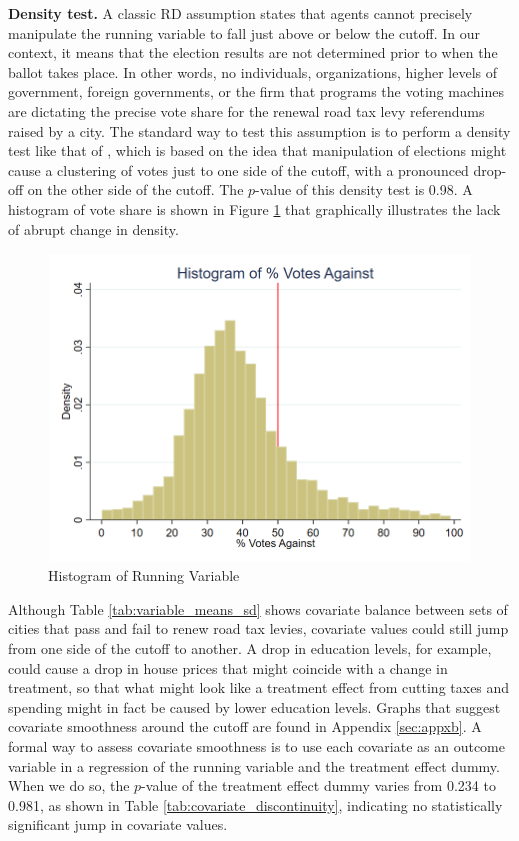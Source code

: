 {\bf Density test.} A classic RD assumption states that agents cannot precisely manipulate the running variable to fall just above or below the cutoff. In our context, it means that the election results are not determined prior to when the ballot takes place. In other words, no individuals, organizations, higher levels of government, foreign governments, or the firm that programs the voting machines are dictating the precise vote share for the renewal road tax levy referendums raised by a city. The standard way to test this assumption is to perform a density test like that of \cite{cattaneo2020simple}, which is based on the idea that manipulation of elections might cause a clustering of votes just to one side of the cutoff, with a pronounced drop-off on the other side of the cutoff. The $p$-value of this density test is 0.98. A histogram of vote share is shown in Figure \ref{fig:running_var_hist} that graphically illustrates the lack of abrupt change in density.

\begin{figure}[ht]
    \centering
    \includegraphics[width=\textwidth,keepaspectratio]{images/votes_pct_against_histogram.png}
    \caption{Histogram of Running Variable}
    \label{fig:running_var_hist}
\end{figure}

Although Table \ref{tab:variable_means_sd} shows covariate balance between sets of cities that pass and fail to renew road tax levies, covariate values could still jump from one side of the cutoff to another. A drop in education levels, for example, could cause a drop in house prices that might coincide with a change in treatment, so that what might look like a treatment effect from cutting taxes and spending might in fact be caused by lower education levels. Graphs that suggest covariate smoothness around the cutoff are found in Appendix \ref{sec:appxb}. A formal way to assess covariate smoothness is to use each covariate as an outcome variable in a regression of the running variable and the treatment effect dummy. When we do so, the $p$-value of the treatment effect dummy varies from 0.234 to 0.981, as shown in Table \ref{tab:covariate_discontinuity}, indicating no statistically significant jump in covariate values. 

